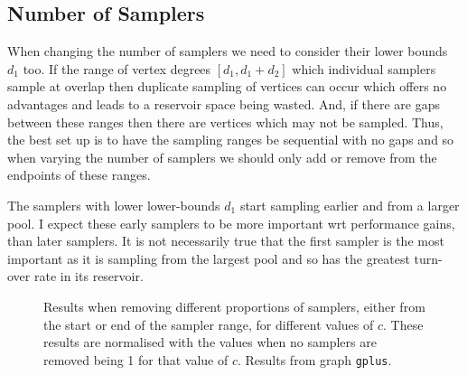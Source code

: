 \documentclass[11pt,twoside,a4paper]{report}
\begin{document}
\subsection{Number of Samplers}

\par When changing the number of samplers we need to consider their lower bounds $d_1$ too. If the range of vertex degrees $[d_1,d_1+d_2]$ which individual samplers sample at overlap then duplicate sampling of vertices can occur which offers no advantages and leads to a reservoir space being wasted. And, if there are gaps between these ranges then there are vertices which may not be sampled. %
Thus, the best set up is to have the sampling ranges be sequential with no gaps and so when varying the number of samplers we should only add or remove from the endpoints of these ranges.

\par The samplers with lower lower-bounds $d_1$ start sampling earlier and from a larger pool. I expect these early samplers to be more important wrt performance gains, than later samplers. It is not necessarily true that the first sampler is the most important as it is sampling from the largest pool and so has the greatest turn-over rate in its reservoir.

\begin{figure}[H]
	\label{Figure 5}
	\caption{Results when removing different proportions of samplers, either from the start or end of the sampler range, for different values of $c$. These results are normalised with the values when no samplers are removed being 1 for that value of $c$. Results from graph \texttt{gplus}.}
\end{figure}
\end{document}
